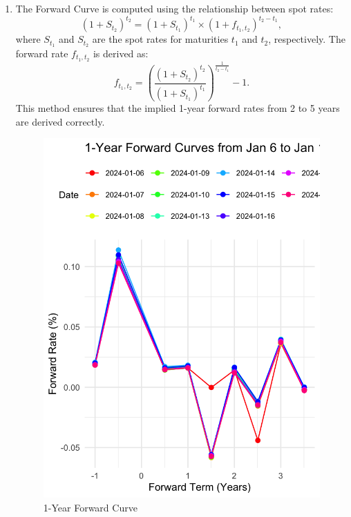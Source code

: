 \documentclass{article}
\begin{document}
\begin{enumerate}
\begin{enumerate}
        \item The Forward Curve is computed using the relationship between spot rates: 
        $$(1 + S_{t_2})^{t_2} = (1 + S_{t_1})^{t_1} \times (1 + f_{t_1, t_2})^{t_2 - t_1},$$
        where $S_{t_1}$ and $S_{t_2}$ are the spot rates for maturities $t_1$ and $t_2$, respectively. The forward rate $f_{t_1, t_2}$ is derived as:
        $$f_{t_1, t_2} = \left( \frac{(1 + S_{t_2})^{t_2}}{(1 + S_{t_1})^{t_1}} \right)^{\frac{1}{t_2 - t_1}} - 1.$$
        This method ensures that the implied 1-year forward rates from 2 to 5 years are derived correctly.
        \begin{figure}[htbp]
    \centering
    \begin{minipage}{0.3\textwidth}
        \centering
        \includegraphics[width=\textwidth]{forward_curve.png} 
        \caption{1-Year Forward Curve}
        \label{fig:forward}
    \end{minipage}
    \hfill
    \begin{minipage}{0.5\textwidth}

\end{minipage}
\end{figure}
\end{enumerate}
\end{enumerate}
\end{document}
